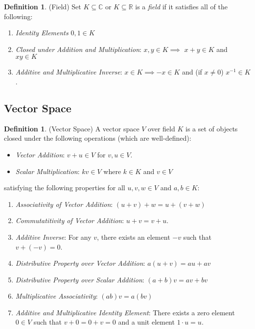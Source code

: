 \documentclass[12pt]{article}
\numberwithin{equation}{section} %
\theoremstyle{plain}
\theoremstyle{definition}
\newtheorem{defn}[thm]{Definition}
\theoremstyle{remark}
\newcommand{\R}{\mathbb{R}}
\newcommand{\C}{\mathbb{C}}
\begin{document}
\begin{defn}(Field)
Set $K\subseteq \C$ or $K\subseteq\R$ is a \emph{field} if it satisfies
all of the following:
\begin{enumerate}[label=(\roman*)]
  \item \emph{Identity Elements} $0,1\in K$
  \item \emph{Closed under Addition and Multiplication}:
      $x,y\in K \implies$ $x+y\in K$ and $xy\in K$
  \item \emph{Additive and Multiplicative Inverse}:
    $x\in K \implies -x\in K$
    and (if $x\neq 0$) $x^{-1}\in K$.
\end{enumerate}
\end{defn}



\subsection{Vector Space}

\begin{defn}(Vector Space)
A vector space $V$ over field $K$ is a set of objects closed under the
following operations (which are well-defined):
\begin{itemize}
  \item \emph{Vector Addition}: $v+u\in V$ for $v,u\in V$.
  \item \emph{Scalar Multiplication}: $kv\in V$ where $k\in K$ and $v\in
    V$
\end{itemize}
satisfying the following properties for all $u,v,w\in V$ and $a,b\in K$:
\begin{enumerate}[label=(\roman*)]
  \item \emph{Associativity of Vector Addition}: $(u+v)+w = u + (v+w)$
  \item \emph{Commutatitivity of Vector Addition}: $u+v=v+u$.
  \item \emph{Additive Inverse}: For any $v$, there exists an element
    $-v$ such that $v+(-v)=0$.
  \item \emph{Distributive Property over Vector Addition}:
    $a(u+v) = au + av$
  \item \emph{Distributive Property over Scalar Addition}:
    $(a+b)v = av + bv$
  \item \emph{Multiplicative Associativity}: $(ab)v = a(bv)$
  \item \emph{Additive and Multiplicative Identity Element}:
    There exists a zero element $0\in V$ such that $v+0 = 0+v=0$ and a
    unit element $1\cdot u = u$.
\end{enumerate}
\end{defn}
\end{document}
